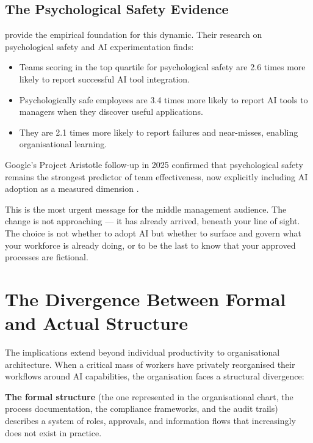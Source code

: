 \subsection{The Psychological Safety Evidence}

\textcite{EdmondsonLei2025} provide the empirical foundation for this dynamic. Their research on psychological safety and AI experimentation finds:

\begin{itemize}
  \item Teams scoring in the top quartile for psychological safety are 2.6 times more likely to report successful AI tool integration.
  \item Psychologically safe employees are 3.4 times more likely to report AI tools to managers when they discover useful applications.
  \item They are 2.1 times more likely to report failures and near-misses, enabling organisational learning.
\end{itemize}

Google's Project Aristotle follow-up in 2025 confirmed that psychological safety remains the strongest predictor of team effectiveness, now explicitly including AI adoption as a measured dimension \parencite{GoogleAristotle2025}.

\begin{cautionbox}[title={The Urgency for Middle Managers}]
This is the most urgent message for the middle management audience. The change is not approaching --- it has already arrived, beneath your line of sight. The choice is not whether to adopt AI but whether to surface and govern what your workforce is already doing, or to be the last to know that your approved processes are fictional.
\end{cautionbox}

\section{The Divergence Between Formal and Actual Structure}

The implications extend beyond individual productivity to organisational architecture. When a critical mass of workers have privately reorganised their workflows around AI capabilities, the organisation faces a structural divergence:

\textbf{The formal structure} (the one represented in the organisational chart, the process documentation, the compliance frameworks, and the audit trails) describes a system of roles, approvals, and information flows that increasingly does not exist in practice.

